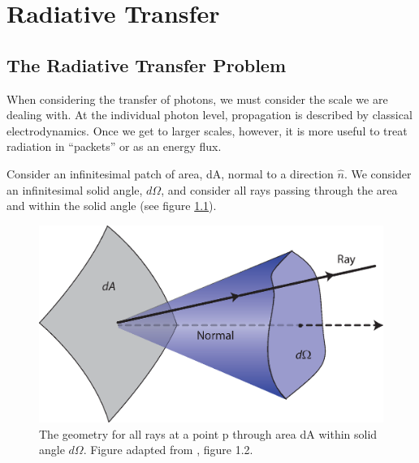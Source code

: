 \pagestyle{fancy}
\headheight 20pt
\chead{}
\lfoot{}
\cfoot{\thepage}
\rfoot{}
\renewcommand{\headrulewidth}{0.1pt}
\renewcommand{\footrulewidth}{0.1pt}

\chapter{Radiative Transfer}
\label{chap:radtransfer}

\thispagestyle{fancy}


\section{The Radiative Transfer Problem}
\label{sec:rtformulation}

When considering the transfer of photons, we must consider the scale we are dealing with. At the individual photon level, propagation is described by classical electrodynamics. Once we get to larger scales, however, it is more useful to treat radiation in ``packets'' or as an energy flux.

Consider an infinitesimal patch of area, dA, normal to a direction $\hat{n}$. We consider an infinitesimal solid angle, $d\Omega$, and consider all rays passing through the area and within the solid angle (see figure \ref{fig:intensity}).

\begin{figure}
\includegraphics[width=\textwidth]{graphics/intensity.eps}
\caption[A visualization of how intensity is measured.]{The geometry for all rays at a point p through area dA within solid angle $d\Omega$. Figure adapted from \citet{rybickiLightman86}, figure 1.2.}
\label{fig:intensity}
\end{figure}

